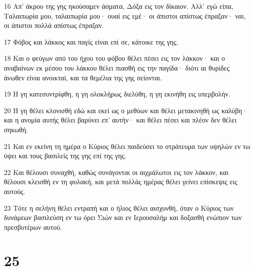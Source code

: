\par 16 Απ' άκρου της γης ηκούσαμεν άσματα, Δόξα εις τον δίκαιον. Αλλ' εγώ είπα, Ταλαιπωρία μου, ταλαιπωρία μου· ουαί εις εμέ· οι άπιστοι απίστως έπραξαν· ναι, οι άπιστοι πολλά απίστως έπραξαν.
\par 17 Φόβος και λάκκος και παγίς είναι επί σε, κάτοικε της γης.
\par 18 Και ο φεύγων από του ήχου του φόβου θέλει πέσει εις τον λάκκον· και ο αναβαίνων εκ μέσου του λάκκου θέλει πιασθή εις την παγίδα· διότι αι θυρίδες άνωθεν είναι ανοικταί, και τα θεμέλια της γης σείονται.
\par 19 Η γη κατεσυντρίφθη, η γη ολοκλήρως διελύθη, η γη εκινήθη εις υπερβολήν.
\par 20 Η γη θέλει κλονισθή εδώ και εκεί ως ο μεθύων και θέλει μετακινηθή ως καλύβη· και η ανομία αυτής θέλει βαρύνει επ' αυτήν· και θέλει πέσει και πλέον δεν θέλει σηκωθή.
\par 21 Και εν εκείνη τη ημέρα ο Κύριος θέλει παιδεύσει το στράτευμα των υψηλών εν τω ύψει και τους βασιλείς της γης επί της γης.
\par 22 Και θέλουσι συναχθή, καθώς συνάγονται οι αιχμάλωτοι εις τον λάκκον, και θέλουσι κλεισθή εν τη φυλακή, και μετά πολλάς ημέρας θέλει γείνει επίσκεψις εις αυτούς.
\par 23 Τότε η σελήνη θέλει εντραπή και ο ήλιος θέλει αισχυνθή, όταν ο Κύριος των δυνάμεων βασιλεύση εν τω όρει Σιών και εν Ιερουσαλήμ και δοξασθή ενώπιον των πρεσβυτέρων αυτού.

\chapter{25}

